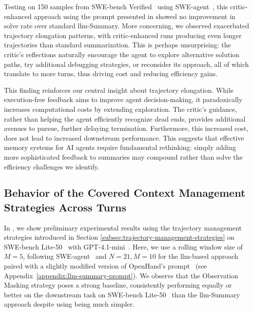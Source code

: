 \documentclass{article}
\begin{document}
Testing on 150 samples from SWE-bench Verified~\cite{openai_swe_bench_verified_2024} using SWE-agent~\cite{yang_swe-agent_2024}, this critic-enhanced approach using the prompt presented in  showed no improvement in solve rate over standard \ac{llm}-Summary. More concerning, we observed exacerbated trajectory elongation patterns, with critic-enhanced runs producing even longer trajectories than standard summarization. This is perhaps unsurprising: the critic's reflections naturally encourage the agent to explore alternative solution paths, try additional debugging strategies, or reconsider its approach, all of which translate to more turns, thus driving cost and reducing efficiency gains.

This finding reinforces our central insight about trajectory elongation. While execution-free feedback aims to improve agent decision-making, it paradoxically increases computational costs by extending exploration. The critic's guidance, rather than helping the agent efficiently recognize dead ends, provides additional avenues to pursue, further delaying termination. Furthermore, this increased cost, does not lead to increased downstream performance. This suggests that effective memory systems for AI agents require fundamental rethinking: simply adding more sophisticated feedback to summaries may compound rather than solve the efficiency challenges we identify.

\subsection{Behavior of the Covered Context Management Strategies Across Turns}
\label{appendix:preliminary-experiments}
In , we show preliminary experimental results using the trajectory management strategies introduced in Section \ref{subsec:trajectory-management-strategies} on SWE-bench Lite-50~\cite{badertdinov2024scaling} with GPT-4.1-mini~\cite{gpt_41_tech_report}. Here, we use a rolling window size of $M=5$, following SWE-agent~\cite{yang_swe-agent_2024} and $N=21,M=10$ for the \ac{llm}-based approach paired with a slightly modified version of OpenHand's prompt~\cite{wang2025openhands} (see Appendix~\ref{appendix:llm-summary-prompt}). We observe that the Observation Masking strategy poses a strong baseline, consistently performing equally or better on the downstream task on SWE-bench Lite-50~\cite{badertdinov2024scaling} than the \ac{llm}-Summary approach despite using being much simpler. 
\end{document}
